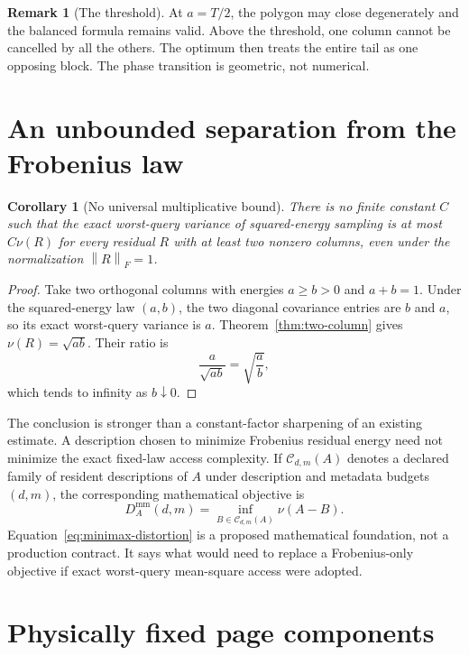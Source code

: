 \documentclass[11pt]{article}
\newtheorem{corollary}[theorem]{Corollary}
\theoremstyle{definition}
\newtheorem{remark}[theorem]{Remark}
\newcommand{\norm}[1]{\left\lVert #1\right\rVert}
\begin{document}
\begin{remark}[The threshold]
At $a=T/2$, the polygon may close degenerately and the balanced formula remains valid.  Above
the threshold, one column cannot be cancelled by all the others.  The optimum then treats the
entire tail as one opposing block.  The phase transition is geometric, not numerical.
\end{remark}

\section{An unbounded separation from the Frobenius law}

\begin{corollary}[No universal multiplicative bound]
\label{cor:unbounded}
There is no finite constant $C$ such that the exact worst-query variance of squared-energy
sampling is at most $C\nu(R)$ for every residual $R$ with at least two nonzero columns, even under
the normalization $\norm{R}_F=1$.
\end{corollary}

\begin{proof}
Take two orthogonal columns with energies $a\ge b>0$ and $a+b=1$.  Under the squared-energy law
$(a,b)$, the two diagonal covariance entries are $b$ and $a$, so its exact worst-query variance is
$a$.  Theorem~\ref{thm:two-column} gives $\nu(R)=\sqrt{ab}$.  Their ratio is
\[
  \frac{a}{\sqrt{ab}}=\sqrt{\frac ab},
\]
which tends to infinity as $b\downarrow0$.
\end{proof}

The conclusion is stronger than a constant-factor sharpening of an existing estimate.  A
description chosen to minimize Frobenius residual energy need not minimize the exact fixed-law
access complexity.  If $\mathcal C_{d,m}(A)$ denotes a declared family of resident descriptions
of $A$ under description and metadata budgets $(d,m)$, the corresponding mathematical objective
is
\begin{equation}
  D_A^{\mathrm{mm}}(d,m)
  =\inf_{B\in\mathcal C_{d,m}(A)}\nu(A-B).
  \label{eq:minimax-distortion}
\end{equation}
Equation~\eqref{eq:minimax-distortion} is a proposed mathematical foundation, not a production
contract.  It says what would need to replace a Frobenius-only objective if exact worst-query
mean-square access were adopted.

\section{Physically fixed page components}
\end{document}
